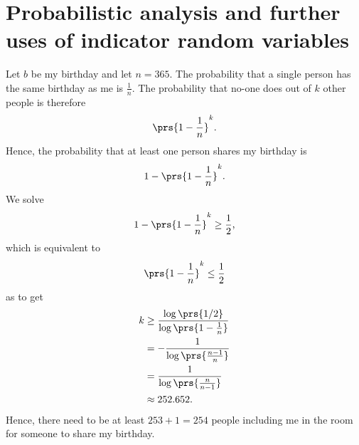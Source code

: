 \documentclass[oneside]{scrbook}
\theoremstyle{definition}
\begin{document}
\section{Probabilistic analysis and further uses of indicator random variables}

\begin{exercise}
Let $b$ be my birthday and let $n = 365$. The probability that a single person has the same birthday as me is $\frac{1}{n}$. The probability that no-one does out of $k$ other people is therefore
\begin{align*}
\prs{1 - \frac{1}{n}}^k \text{.}
\end{align*}
Hence, the probability that at least one person shares my birthday is
\[1 - \prs{1-\frac{1}{n}}^k \text{.}\]
We solve
\[1 - \prs{1-\frac{1}{n}}^k \geq \frac{1}{2} \text{,}\]
which is equivalent to
\begin{align*}
\prs{1-\frac{1}{n}}^k \leq \frac{1}{2}
\end{align*}
as to get
\begin{align*}
k &\geq \frac{\log\prs{1/2}}{\log\prs{1 - \frac{1}{n}}}
\\&= - \frac{1}{\log\prs{\frac{n - 1}{n}}}
\\&= \frac{1}{\log\prs{\frac{n}{n-1}}}
\\&\approx 252.652 \text{.}
\end{align*}
Hence, there need to be at least $253+1 = 254$ people including me in the room for someone to share my birthday.

\end{exercise}

\begin{exercise}
\end{exercise}

\begin{exercise}
\end{exercise}

\begin{exercise}
\end{exercise}

\begin{exercise}
\end{exercise}

\begin{exercise}
\end{exercise}

\begin{exercise}
\end{exercise}
\end{document}
